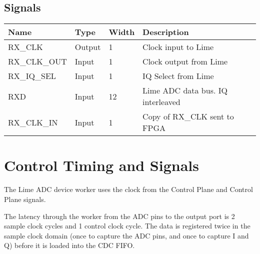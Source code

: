 \documentclass{article}
\begin{document}
\begin{landscape}
	\section*{Signals}
	\begin{scriptsize}
		\begin{tabular}{|M{2.5cm}|M{1.5cm}|M{1.5cm}|M{14.5cm}|}
			\hline
			Name         & Type   & Width & Description                       \\
			\hline
			RX\_CLK      & Output & 1     & Clock input to Lime               \\
			\hline
			RX\_CLK\_OUT & Input  & 1     & Clock output from Lime            \\
			\hline
			RX\_IQ\_SEL  & Input  & 1     & IQ Select from Lime               \\
			\hline
			RXD          & Input  & 12    & Lime ADC data bus. IQ interleaved \\
			\hline
			RX\_CLK\_IN  & Input  & 1     & Copy of RX\_CLK sent to FPGA      \\
			\hline
		\end{tabular}
	\end{scriptsize}
\end{landscape}

\section*{Control Timing and Signals}
The Lime ADC device worker uses the clock from the Control Plane and Control Plane signals.\par\bigskip
\noindent The latency through the worker from the ADC pins to the output port is 2 sample clock cycles and 1 control clock cycle. The data is registered twice in the sample clock domain (once to capture the ADC pins, and once to capture I and Q) before it is loaded into the CDC FIFO.
\end{document}
